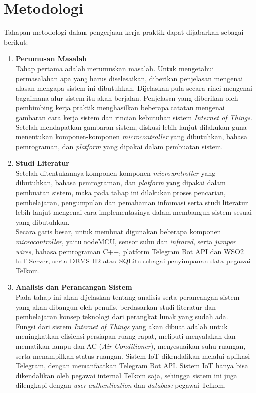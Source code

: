 \section{Metodologi}
\tab Tahapan metodologi dalam pengerjaan kerja praktik dapat dijabarkan sebagai berikut:
\begin{enumerate}
	\item \textbf{Perumusan Masalah}\\
	\tab Tahap pertama adalah merumuskan masalah. Untuk mengetahui permasalahan apa yang harus diselesaikan, diberikan penjelasan mengenai alasan mengapa sistem ini dibutuhkan. Dijelaskan pula secara rinci mengenai bagaimana alur sistem itu akan berjalan. Penjelasan yang diberikan oleh pembimbing kerja praktik menghasilkan beberapa catatan mengenai gambaran cara kerja sistem dan rincian kebutuhan sistem \textit{Internet of Things}. Setelah mendapatkan gambaran sistem, diskusi lebih lanjut dilakukan guna menentukan komponen-komponen \textit{microcontroller} yang dibutuhkan, bahasa pemrograman, dan \textit{platform} yang dipakai dalam pembuatan sistem.\\
	
	\item \textbf{Studi Literatur}\\
	\tab Setelah ditentukannya komponen-komponen \textit{microcontroller} yang dibutuhkan, bahasa pemrograman, dan \textit{platform} yang dipakai dalam pembuatan sistem, maka pada tahap ini dilakukan proses pencarian, pembelajaran, pengumpulan
	dan pemahaman informasi serta studi literatur lebih lanjut mengenai cara implementasinya dalam membangun sistem sesuai yang dibutuhkan.\\
	\tab Secara garis besar, untuk membuat \namaSistem digunakan beberapa komponen \textit{microcontroller}, yaitu nodeMCU, sensor suhu dan \textit{infrared}, serta \textit{jumper wires}, bahasa pemrograman C++, platform Telegram Bot API dan WSO2 IoT Server, serta DBMS H2 atau SQLite sebagai penyimpanan data pegawai Telkom.\\
	
	\item \textbf{Analisis dan Perancangan Sistem}\\
	\tab Pada tahap ini akan dijelaskan tentang analisis serta perancangan sistem yang akan dibangun oleh penulis, berdasarkan studi literatur dan pembelajaran konsep teknologi dari perangkat lunak yang sudah ada.\\
	\tab Fungsi dari sistem \textit{Internet of Things} yang akan dibuat adalah untuk meningkatkan efisiensi persiapan ruang rapat, meliputi menyalakan dan mematikan lampu dan AC (\textit{Air Conditioner}), menyesuaikan suhu ruangan, serta menampilkan status ruangan. Sistem IoT dikendalikan melalui aplikasi Telegram, dengan memanfaatkan Telegram Bot API. Sistem IoT hanya bisa dikendalikan oleh pegawai internal Telkom saja, sehingga sistem ini juga dilengkapi dengan \textit{user authentication} dan \textit{database} pegawai Telkom.\\
	

\end{enumerate}
